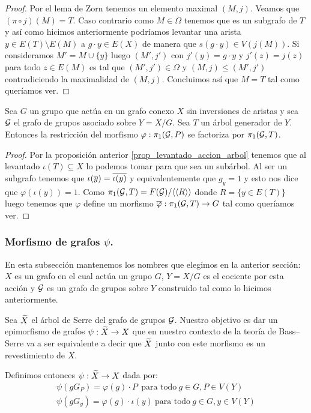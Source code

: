 \documentclass[tesis.tex]{subfiles}
\begin{document}
\begin{proof}
	
	Por el lema de Zorn tenemos un elemento maximal $(M,j)$.
	Veamos que $(\pi \circ j)(M) = T$.
	Caso contrario como $M \in \Omega$ tenemos que es un subgrafo de $T$ y así como hicimos anteriormente podríamos levantar una arista $y \in E(T) \setminus E(M)$ a $g\cdot y \in E(X)$ de manera que $s(g\cdot y ) \in V(j(M))$.
	Si consideramos $M' =M \cup \{y\}$ luego $(M', j')$ con $j'(y) = g \cdot y$ y $j'(z) = j(z)$ para todo $z \in E(M)$ es tal que $(M',j') \in \Omega$ y $(M,j) \le (M',j')$ contradiciendo la maximalidad de $(M,j)$.
	Concluimos así que $M = T$ tal como queríamos ver.	
\end{proof}



\begin{coro}
	Sea $G$ un grupo que actúa en un grafo conexo $X$ sin inversiones de aristas y sea ${\cal G}$ el grafo de grupos asociado sobre $Y = X / G$.
	Sea $T$ un árbol generador de $Y$.
	Entonces la restricción del morfismo $\varphi: \pi_1({\cal G}, P)$ se factoriza por $\pi_1({\cal G}, T)$.
\end{coro}
\begin{proof}
	Por la proposición anterior \ref{prop_levantado_accion_arbol} tenemos que al levantado $\iota(T) \subseteq X$ lo podemos tomar para que sea un subárbol.
	Al ser un subgrafo tenemos que $\iota(\overline y) = \overline {\iota (y)}$ y equivalentemente que $g_{y}=1$ y esto nos dice que $\varphi(\iota(y)) = 1$.
	Como $\pi_1({\cal G},T) = F({\cal G}) / \langle \langle R \rangle \rangle$ donde $R = \{ y \in E(T) \}$ luego tenemos que $\varphi$ define un morfismo $\overline \varphi: \pi_1({\cal G}, T) \to G$ tal como queríamos ver.
\end{proof}

\subsubsection{Morfismo de grafos $\psi$.}

En esta subsección mantenemos los nombres que elegimos en la anterior sección: $X$ es un grafo en el cual actúa un grupo $G$, $Y = X/G$ es el cociente por esta acción y ${\cal G}$ es un grafo de grupos sobre $Y$ construido tal como lo hicimos anteriormente.

Sea $\widetilde X$ el árbol de Serre del grafo de grupos ${\cal G}$.
Nuestro objetivo es dar un epimorfismo de grafos $\psi:\widetilde X \to X$ que en nuestro contexto de la teoría de Bass--Serre va a ser equivalente a decir que $\widetilde X$ junto con este morfismo es un revestimiento de $X$.


Definimos entonces $\psi: \widetilde X \to X$ dada por: 
\begin{align*}
	\psi(g G_P ) = \varphi(g) \cdot P \ \ \text{para todo} \ g \in G, P \in V(Y) \\
	\psi(g G_y ) = \varphi(g) \cdot \iota(y) \ \text{para todo} \ g \in G, y \in V(Y)
\end{align*}
\end{document}
